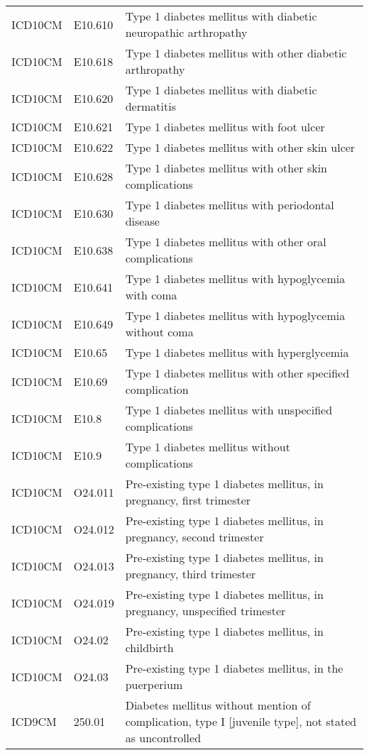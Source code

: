 \begin{longtable}{p{}p{}p{}}
  ICD10CM & E10.610 & Type 1 diabetes mellitus with diabetic neuropathic arthropathy \\ 
  ICD10CM & E10.618 & Type 1 diabetes mellitus with other diabetic arthropathy \\ 
  ICD10CM & E10.620 & Type 1 diabetes mellitus with diabetic dermatitis \\ 
  ICD10CM & E10.621 & Type 1 diabetes mellitus with foot ulcer \\ 
  ICD10CM & E10.622 & Type 1 diabetes mellitus with other skin ulcer \\ 
  ICD10CM & E10.628 & Type 1 diabetes mellitus with other skin complications \\ 
  ICD10CM & E10.630 & Type 1 diabetes mellitus with periodontal disease \\ 
  ICD10CM & E10.638 & Type 1 diabetes mellitus with other oral complications \\ 
  ICD10CM & E10.641 & Type 1 diabetes mellitus with hypoglycemia with coma \\ 
  ICD10CM & E10.649 & Type 1 diabetes mellitus with hypoglycemia without coma \\ 
  ICD10CM & E10.65 & Type 1 diabetes mellitus with hyperglycemia \\ 
  ICD10CM & E10.69 & Type 1 diabetes mellitus with other specified complication \\ 
  ICD10CM & E10.8 & Type 1 diabetes mellitus with unspecified complications \\ 
  ICD10CM & E10.9 & Type 1 diabetes mellitus without complications \\ 
  ICD10CM & O24.011 & Pre-existing type 1 diabetes mellitus, in pregnancy, first trimester \\ 
  ICD10CM & O24.012 & Pre-existing type 1 diabetes mellitus, in pregnancy, second trimester \\ 
  ICD10CM & O24.013 & Pre-existing type 1 diabetes mellitus, in pregnancy, third trimester \\ 
  ICD10CM & O24.019 & Pre-existing type 1 diabetes mellitus, in pregnancy, unspecified trimester \\ 
  ICD10CM & O24.02 & Pre-existing type 1 diabetes mellitus, in childbirth \\ 
  ICD10CM & O24.03 & Pre-existing type 1 diabetes mellitus, in the puerperium \\ 
  ICD9CM & 250.01 & Diabetes mellitus without mention of complication, type I [juvenile type], not stated as uncontrolled \\ 

\end{longtable}
